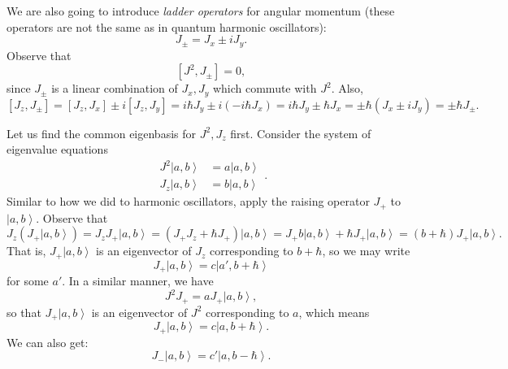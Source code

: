 \documentclass[phys334]{subfiles}
\begin{document}
    \np We are also going to introduce \textit{ladder operators} for angular momentum (these operators are not the same as in quantum harmonic oscillators):
    \begin{equation*}
        J_{\pm} = J_x \pm iJ_y.
    \end{equation*}
    Observe that
    \begin{equation*}
        \left[ J^{2},J_{\pm} \right] = 0,
    \end{equation*}
    since $J_{\pm}$ is a linear combination of $J_x,J_y$ which commute with $J^{2}$. Also,
    \begin{equation*}
        \left[ J_z,J_{\pm} \right] = \left[ J_z,J_x \right]\pm i\left[ J_z,J_y \right] = i\hbar J_y \pm i\left( -i\hbar J_x \right) = i\hbar J_y\pm\hbar J_x = \pm\hbar\left( J_x\pm iJ_y \right) = \pm\hbar J_{\pm}.
    \end{equation*}

    \np Let us find the common eigenbasis for $J^{2},J_z$ first. Consider the system of eigenvalue equations
    \begin{equation*}
        \begin{aligned}
            J^{2}\left| a,b \right\rangle & = a\left| a,b \right\rangle \\
            J_z\left| a,b \right\rangle & = b\left| a,b \right\rangle
        \end{aligned} .
    \end{equation*}
    Similar to how we did to harmonic oscillators, apply the raising operator $J_+$ to $\left| a,b \right\rangle$. Observe that
    \begin{equation*}
        J_z\left( J_+\left| a,b \right\rangle \right) = J_zJ_+\left| a,b \right\rangle = \left( J_+J_z+\hbar J_+ \right)\left| a,b \right\rangle = J_+b\left| a,b \right\rangle + \hbar J_+\left| a,b \right\rangle = \left( b+\hbar \right)J_+\left| a,b \right\rangle.
    \end{equation*}
    That is, $J_+\left| a,b \right\rangle$ is an eigenvector of $J_z$ corresponding to $b+\hbar$, so we may write
    \begin{equation*}
        J_+\left| a,b \right\rangle = c\left| a',b+\hbar \right\rangle
    \end{equation*}
    for some $a'$. In a similar manner, we have
    \begin{equation*}
        J^{2}J_+ = aJ_+\left| a,b \right\rangle,
    \end{equation*}
    so that $J_+\left| a,b \right\rangle$ is an eigenvector of $J^{2}$ corresponding to $a$, which means
    \begin{equation}
        J_{+}\left| a,b \right\rangle = c\left| a,b+\hbar \right\rangle.
    \end{equation}
    We can also get:
    \begin{equation}
        J_-\left| a,b \right\rangle = c'\left| a,b-\hbar \right\rangle.
    \end{equation}
    
\end{document}
